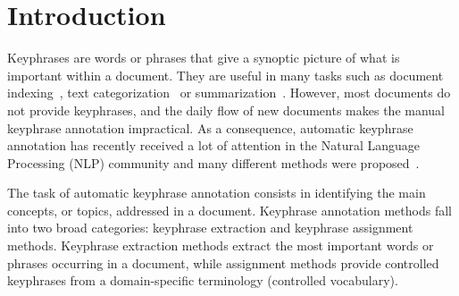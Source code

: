 \section{Introduction}
\label{sec: introduction}
  
  Keyphrases are words or phrases that give a synoptic picture of what is
  important within a document. They are useful in many tasks such as
  document indexing~\cite{gutwin1999keyphrasesfordigitallibraries}, text
  categorization~\cite{hulth-megyesi:2006:COLACL} or
  summarization~\cite{litvak2008graphbased}. However, most documents do not
  provide keyphrases, and the daily flow of new documents makes the manual
  keyphrase annotation impractical. As a consequence, automatic keyphrase
  annotation has recently received a lot of attention in the Natural Language
  Processing (NLP) community and many different methods were 
  proposed~\cite{hasan2014state_of_the_art}.


  
  The task of automatic keyphrase annotation consists in identifying the main 
  concepts, or topics, addressed in a document.
  Keyphrase annotation methods fall into two broad categories: keyphrase 
  extraction and keyphrase assignment methods.
  Keyphrase extraction methods extract the most important words or phrases
  occurring in a document, while assignment methods provide controlled 
  keyphrases from a domain-specific terminology (controlled vocabulary).

